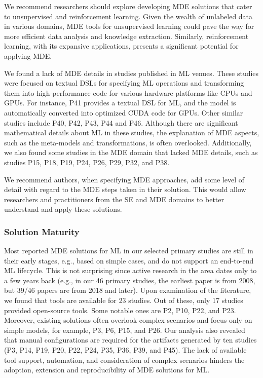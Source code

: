 We recommend researchers should explore developing MDE solutions that cater to unsupervised and reinforcement learning. Given the wealth of unlabeled data in various domains, MDE tools for unsupervised learning could pave the way for more efficient data analysis and knowledge extraction.
Similarly, reinforcement learning, with its expansive applications, presents a significant potential for applying MDE.

 We found a lack of MDE details in studies published in ML venues. These studies were focused on textual DSLs for specifying ML operations and transforming them into high-performance code for various hardware platforms like CPUs and GPUs. For instance, P41 provides a textual DSL for ML, and the model is automatically converted into optimized CUDA code for GPUs. Other similar studies include P40, P42, P43, P44 and P46. Although there are significant mathematical details about ML in these studies, the explanation of MDE aspects, such as the meta-models and transformations, is often overlooked. Additionally, we also found some studies in the MDE domain that lacked MDE details, such as studies P15, P18, P19, P24, P26, P29, P32, and P38.
 
We recommend authors, when specifying MDE approaches, add some level of detail with regard to the MDE steps taken in their solution. This would allow researchers and practitioners from the SE and MDE domains to better understand and apply these solutions.

\subsubsection{Solution Maturity}
Most reported MDE solutions for ML in our selected primary studies are still in their early stages, e.g., based on simple cases, and do not support an end-to-end ML lifecycle. This is not surprising since active research in the area dates only to a few years back (e.g., in our 46 primary studies, the earliest paper is from 2008, but 39/46 papers are from 2018 and later). Upon examination of the literature, we found that tools are available for 23 studies. Out of these, only 17 studies provided open-source tools. Some notable ones are P2, P10, P22, and P23. Moreover, existing solutions often overlook complex scenarios and focus only on simple models, for example, P3, P6, P15, and P26. Our analysis also revealed that manual configurations are required for the artifacts generated by ten studies (P3, P14, P19, P20, P22, P24, P35, P36, P39, and P45). The lack of available tool support, automation, and consideration of complex scenarios hinders the adoption, extension and reproducibility of MDE solutions for ML. %


